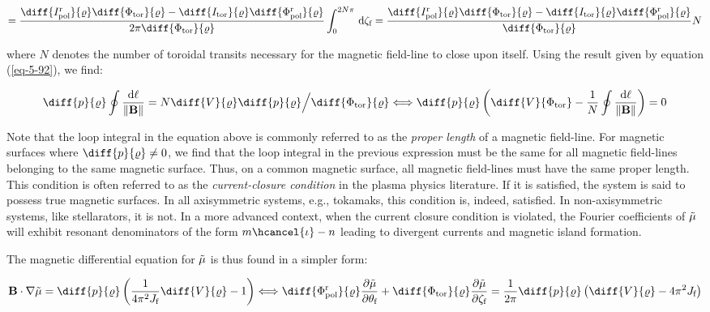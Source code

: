 \begin{equation}
    =\frac{\diff{I_\text{pol}^\text{r}}{\varrho}\diff{\Phi_\text{tor}}{\varrho}-\diff{I_\text{tor}}{\varrho}\diff{\Phi_\text{pol}^\text{r}}{\varrho}}{2\pi\diff{\Phi_\text{tor}}{\varrho}}\int_0^{2N\pi}\,\mathrm{d}\zeta_\text{f}=\frac{\diff{I_\text{pol}^\text{r}}{\varrho}\diff{\Phi_\text{tor}}{\varrho}-\diff{I_\text{tor}}{\varrho}\diff{\Phi_\text{pol}^\text{r}}{\varrho}}{\diff{\Phi_\text{tor}}{\varrho}}N
\end{equation}

where $N$ denotes the number of toroidal transits necessary for the magnetic field-line to close upon itself. Using the result given by equation (\ref{eq-5-92}), we find:

\begin{equation}
    \diff{p}{\varrho}\oint\frac{\mathrm{d}\ell}{\|\mathbf{B}\|}=N\diff{V}{\varrho}\diff{p}{\varrho}\Big/\diff{\Phi_\text{tor}}{\varrho}\Longleftrightarrow\diff{p}{\varrho}\left(\diff{V}{\Phi_\text{tor}}-\frac{1}{N}\oint\frac{\mathrm{d}\ell}{\|\mathbf{B}\|}\right)=0
\end{equation}

Note that the loop integral in the equation above is commonly referred to as the \textit{proper length} of a magnetic field-line. For magnetic surfaces where $\diff{p}{\varrho}\neq0$, we find that the loop integral in the previous expression must be the same for all magnetic field-lines belonging to the same magnetic surface. Thus, on a common magnetic surface, all magnetic field-lines must have the same proper length. This condition is often referred to as the \textit{current-closure condition} in the plasma physics literature. If it is satisfied, the system is said to possess true magnetic surfaces. In all axisymmetric systems, e.g., tokamaks, this condition is, indeed, satisfied. In non-axisymmetric systems, like stellarators, it is not. In a more advanced context, when the current closure condition is violated, the Fourier coefficients of $\Tilde{\mu}$ will exhibit resonant denominators of the form $m\hcancel{\iota}-n$ leading to divergent currents and magnetic island formation.

\quad The magnetic differential equation for $\Tilde{\mu}$ is thus found in a simpler form:

\begin{equation}
    \mathbf{B}\cdot\nabla\Tilde{\mu}=\diff{p}{\varrho}\left(\frac{1}{4\pi^2J_\text{f}}\diff{V}{\varrho}-1\right)\Longleftrightarrow\diff{\Phi_\text{pol}^\text{r}}{\varrho}\frac{\partial\Tilde{\mu}}{\partial\theta_\text{f}}+\diff{\Phi_\text{tor}}{\varrho}\frac{\partial\Tilde{\mu}}{\partial\zeta_\text{f}}=\frac{1}{2\pi}\diff{p}{\varrho}\left(\diff{V}{\varrho}-4\pi^2J_\text{f}\right)
\end{equation}

